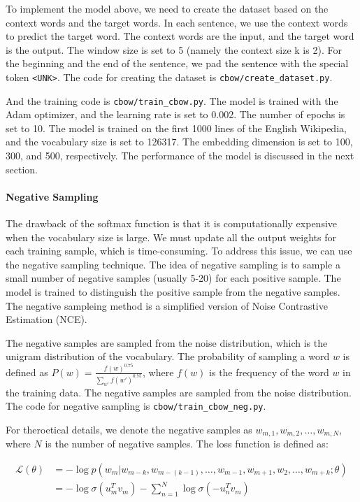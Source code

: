\documentclass[UTF8,a4paper,12pt]{article}
\begin{document}
To implement the model above, we need to create the dataset based on the context words and the target words. In each sentence, we use the context words to predict the target word. The context words are the input, and the target word is the output. The window size is set to 5 (namely the context size k is 2). For the beginning and the end of the sentence, we pad the sentence with the special token \texttt{<UNK>}. The code for creating the dataset is \texttt{cbow/create\_dataset.py}.

And the training code is \texttt{cbow/train\_cbow.py}. The model is trained with the Adam optimizer, and the learning rate is set to 0.002. The number of epochs is set to 10. The model is trained on the first 1000 lines of the English Wikipedia, and the vocabulary size is set to 126317. The embedding dimension is set to 100, 300, and 500, respectively. The performance of the model is discussed in the next section.

\paragraph{Negative Sampling}

The drawback of the softmax function is that it is computationally expensive when the vocabulary size is large. We must update all the output weights for each training sample, which is time-consuming. To address this issue, we can use the negative sampling technique. The idea of negative sampling is to sample a small number of negative samples (usually 5-20) for each positive sample. The model is trained to distinguish the positive sample from the negative samples. The negative sampleing method is a simplified version of Noise Contrastive Estimation (NCE). 

The negative samples are sampled from the noise distribution, which is the unigram distribution of the vocabulary. The probability of sampling a word $w$ is defined as $P(w) = \frac{f(w)^{0.75}}{\sum_{w'} f(w')^{0.75}}$, where $f(w)$ is the frequency of the word $w$ in the training data. The negative samples are sampled from the noise distribution. The code for negative sampling is \texttt{cbow/train\_cbow\_neg.py}.

For theroetical details, we denote the negative samples as $w_{m,1}, w_{m,2}, \ldots, w_{m,N}$, where $N$ is the number of negative samples. The loss function is defined as:

\begin{equation}
    \begin{aligned}
        \mathcal{L}(\theta) &= -\log p(w_m|w_{m-k}, w_{m-(k-1)}, \ldots, w_{m-1}, w_{m+1}, w_{2}, \ldots, w_{m+k}; \theta) \\
        &= -\log \sigma(u_m^T v_m) - \sum_{n=1}^N \log \sigma(-u_n^T v_m)
    \end{aligned}
\end{equation}
\end{document}
